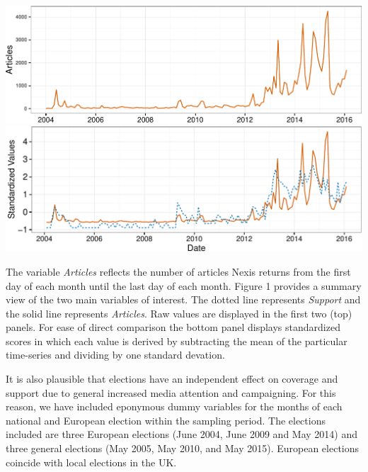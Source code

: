 \documentclass[12pt,]{article}
\makeatletter
\def\maxwidth{\ifdim\Gin@nat@width>\linewidth\linewidth
\else\Gin@nat@width\fi}
\let\Oldincludegraphics\includegraphics
\renewcommand{\includegraphics}[1]{\Oldincludegraphics[width=\maxwidth]{#1}}
\makeatother
\begin{document}
\includegraphics{ukip_media_files/figure-latex/unnamed-chunk-2-1.pdf}
\includegraphics{ukip_media_files/figure-latex/unnamed-chunk-3-1.pdf}

\setlength\parindent{24pt}

The variable \emph{Articles} reflects the number of articles Nexis
returns from the first day of each month until the last day of each
month. Figure 1 provides a summary view of the two main variables of
interest. The dotted line represents \emph{Support} and the solid line
represents \emph{Articles}. Raw values are displayed in the first two
(top) panels. For ease of direct comparison the bottom panel displays
standardized scores in which each value is derived by subtracting the
mean of the particular time-series and dividing by one standard
devation.

It is also plausible that elections have an independent effect on
coverage and support due to general increased media attention and
campaigning. For this reason, we have included eponymous dummy variables
for the months of each national and European election within the
sampling period. The elections included are three European elections
(June 2004, June 2009 and May 2014) and three general elections (May
2005, May 2010, and May 2015). European elections coincide with local
elections in the UK.
\end{document}
